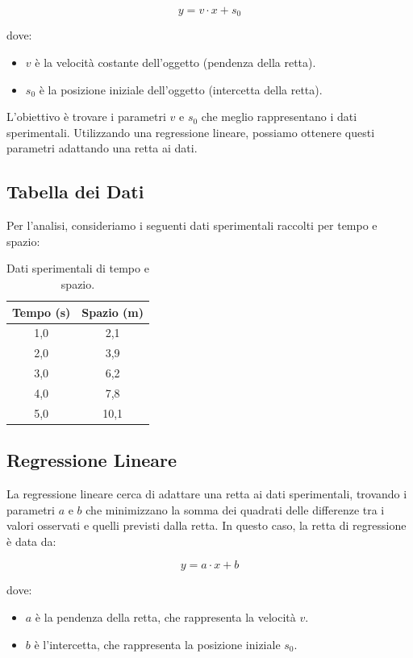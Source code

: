 \[
y = v \cdot x + s_0
\]

dove:
\begin{itemize}
    \item \( v \) è la velocità costante dell'oggetto (pendenza della retta).
    \item \( s_0 \) è la posizione iniziale dell'oggetto (intercetta della retta).
\end{itemize}

L'obiettivo è trovare i parametri \( v \) e \( s_0 \) che meglio rappresentano i dati sperimentali. Utilizzando una regressione lineare, possiamo ottenere questi parametri adattando una retta ai dati.

\subsection{Tabella dei Dati}

Per l'analisi, consideriamo i seguenti dati sperimentali raccolti per tempo e spazio:

\begin{table}[h!]
    \centering
    \begin{tabular}{|c|c|}
    \hline
    \textbf{Tempo (\si{\second})} & \textbf{Spazio (\si{\meter})} \\
    \hline
    1,0 & 2,1 \\
    2,0 & 3,9 \\
    3,0 & 6,2 \\
    4,0 & 7,8 \\
    5,0 & 10,1 \\
    \hline
    \end{tabular}
    \caption{Dati sperimentali di tempo e spazio.}
    \label{tab:dati}
\end{table}

\subsection{Regressione Lineare}

La regressione lineare cerca di adattare una retta ai dati sperimentali, trovando i parametri \( a \) e \( b \) che minimizzano la somma dei quadrati delle differenze tra i valori osservati e quelli previsti dalla retta. In questo caso, la retta di regressione è data da:

\[
y = a \cdot x + b
\]

dove:
\begin{itemize}
    \item \( a \) è la pendenza della retta, che rappresenta la velocità \( v \).
    \item \( b \) è l'intercetta, che rappresenta la posizione iniziale \( s_0 \).
\end{itemize}

